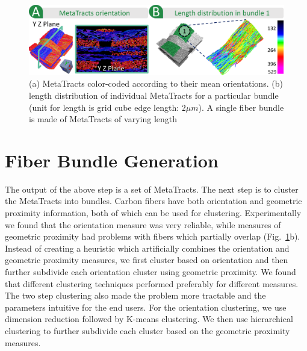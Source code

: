 

\begin{figure}[tb]
\centering
	\includegraphics[width=\linewidth]{images_pvis/figure5.pdf}
	\caption{(a) MetaTracts color-coded according to their mean orientations. (b) length distribution of individual MetaTracts for a particular bundle (unit for length is grid cube edge length:  $2\mu m$). A single fiber bundle is made of MetaTracts of varying length}
	\label{fig:length_distribution}
\end{figure}


\section {Fiber Bundle Generation}
\label{subsec:fiber-bundles}

The output of the above step is a set of MetaTracts. The next step is to cluster the MetaTracts into bundles. 
Carbon fibers have both orientation and geometric proximity information, both of which can be used for clustering. Experimentally we found that the orientation measure was very reliable, while measures of geometric proximity had problems with fibers which partially overlap (Fig.~\ref{fig:length_distribution}b).  
Instead of creating a heuristic which artificially combines the orientation and geometric proximity measures, we first cluster based on orientation and then further subdivide each orientation cluster using geometric proximity.
We found that different clustering techniques performed preferably for different measures.  The two step clustering also made the problem more tractable and  the parameters intuitive for the end users. For the orientation clustering, we use dimension reduction followed by K-means clustering. We then use hierarchical clustering to further subdivide each cluster based on the geometric proximity measures. 

